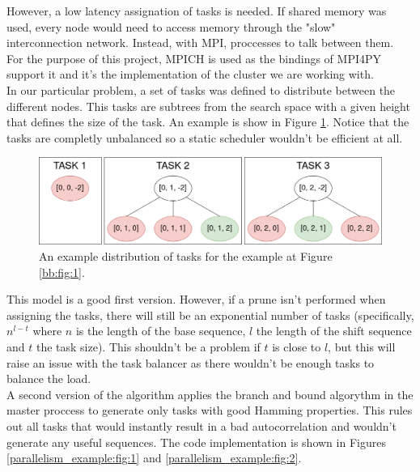   However, a low latency assignation of tasks is needed. If shared
  memory was used, every node would need to access memory through the "slow"
  interconnection network. Instead, with MPI, proccesses to talk between them.\\

  For the purpose of this project, MPICH\cite{mpich} is used as the bindings of
  MPI4PY support it and it's the implementation of the cluster we are working
  with\cite{calderon}.\\

  In our particular problem, a set of tasks was defined to
  distribute between the different nodes. This tasks are subtrees from the
  search space with a given height that defines the size of the task. An
  example is show in Figure \ref{tasks:fig:1}. Notice that the tasks are
  completly unbalanced so a static scheduler wouldn't be efficient at all.\\


  \begin{figure}[ht!]
    \begin{center}
      \includegraphics[scale=0.4]{Chapters/Implementation/Example_tasks.png}
    \end{center}
    \caption{An example distribution of tasks for the example at Figure
    \ref{bb:fig:1}.}
    \label{tasks:fig:1}
  \end{figure}

  This model is a good first version. However, if a prune isn't performed when
  assigning the tasks, there will still be an exponential number of tasks
  (specifically, $n^{l-t}$ where $n$ is the length of the base sequence, $l$ the
  length of the shift sequence and $t$ the task size). This shouldn't be a problem
  if $t$ is close to $l$, but this will raise an issue with the task balancer as
  there wouldn't be enough tasks to balance the load.\\

  A second version of the algorithm applies the branch and bound algorythm in
  the master proccess to generate only tasks with good Hamming properties.
  This rules out all tasks that would instantly result in a bad
  autocorrelation and wouldn't generate any useful sequences. The code
  implementation is shown in Figures \ref{parallelism_example:fig:1} and
  \ref{parallelism_example:fig:2}.\\

